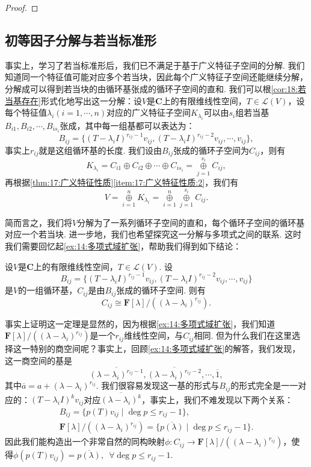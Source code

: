 \begin{proof}

\end{proof}

\subsection{初等因子分解与若当标准形}
事实上，学习了若当标准形后，我们已不满足于基于广义特征子空间的分解. 我们知道同一个特征值可能对应多个若当块，因此每个广义特征子空间还能继续分解，分解成可以得到若当块的由循环基张成的循环子空间的直和. 我们可以根\autoref{cor:18:若当基存在}形式化地写出这一分解：设$V$是$\mathbf{C}$上的有限维线性空间，$T\in\mathcal{L}(V)$，设每个特征值$\lambda_i(i=1,\cdots,n)$对应的广义特征子空间$K_{\lambda_i}$可以由$s_i$组若当基$B_{i1},B_{i2},\cdots,B_{is_i}$张成，其中每一组基都可以表达为：
\[B_{ij}=\{(T-\lambda_iI)^{r_{ij}-1}v_{ij},(T-\lambda_iI)^{r_{ij}-2}v_{ij},\cdots,v_{ij}\},\]
事实上$r_{ij}$就是这组循环基的长度. 我们设由$B_{ij}$张成的循环子空间为$C_{ij}$，则有
\[K_{\lambda_i}=C_{i1}\oplus C_{i2}\oplus\cdots\oplus C_{is_i}=\mathop{\oplus}\limits_{j=1}^{s_i} C_{ij},\]
再根据\autoref{thm:17:广义特征性质}\ref{item:17:广义特征性质:2}，我们有
\begin{equation} \label{eq:19:循环子空间分解}
    V=\mathop{\oplus}\limits_{i=1}^n K_{\lambda_i}=\mathop{\oplus}\limits_{i=1}^n\mathop{\oplus}\limits_{j=1}^{s_i} C_{ij}.
\end{equation}

简而言之，我们将$V$分解为了一系列循环子空间的直和，每个循环子空间的循环基对应一个若当块. 进一步地，我们也希望探究这一分解与多项式之间的联系. 这时我们需要回忆起\autoref{ex:14:多项式域扩张}，帮助我们得到如下结论：
\begin{theorem} \label{thm:19:循环子空间同构于商空间}
    设$V$是$\mathbf{C}$上的有限维线性空间，$T\in\mathcal{L}(V)$. 设
    \[B_{ij}=\{(T-\lambda_iI)^{r_{ij}-1}v_{ij},(T-\lambda_iI)^{r_{ij}-2}v_{ij},\cdots,v_{ij}\}\]
    是$V$的一组循环基，$C_{ij}$是由$B_{ij}$张成的循环子空间. 则有
    \[C_{ij}\cong \mathbf{F}[\lambda]/((\lambda-\lambda_i)^{r_{ij}}).\]
\end{theorem}

事实上证明这一定理是显然的，因为根据\autoref{ex:14:多项式域扩张}，我们知道$\mathbf{F}[\lambda]/((\lambda-\lambda_i)^{r_{ij}})$是一个$r_{ij}$维线性空间，与$C_{ij}$相同. 但为什么我们在这里选择这一特别的商空间呢？事实上，回顾\autoref{ex:14:多项式域扩张}的解答，我们发现，这一商空间的基是
\[\overline{(\lambda-\lambda_i)^{r_{ij}-1}},\overline{(\lambda-\lambda_i)^{r_{ij}-2}},\cdots,\overline{1},\]
其中$\overline{a}=a+(\lambda-\lambda_i)^{r_{ij}}$. 我们很容易发现这一基的形式与$B_{ij}$的形式完全是一一对应的：$(T-\lambda_iI)^kv_{ij}$对应$\overline{(\lambda-\lambda_i)^k}$，事实上，我们不难发现以下两个关系：
\begin{gather*}
    B_{ij}=\{p(T)v_{ij}\mid \deg p\leqslant r_{ij}-1\},\\
    \mathbf{F}[\lambda]/((\lambda-\lambda_i)^{r_{ij}})=\{\overline{p(\lambda)}\mid \deg p\leqslant r_{ij}-1\}.
\end{gather*}
因此我们能构造出一个非常自然的同构映射$\phi:C_{ij}\to \mathbf{F}[\lambda]/((\lambda-\lambda_i)^{r_{ij}})$，使得$\phi(p(T)v_{ij})=\overline{p(\lambda)},\enspace\forall \deg p\leqslant r_{ij}-1$.

